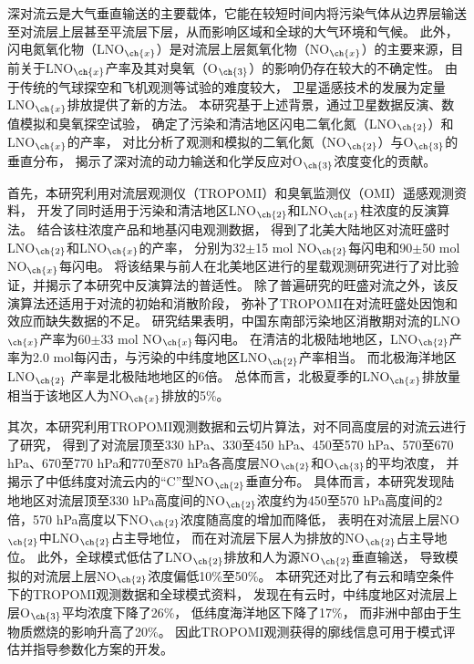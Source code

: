 
\abstract
{
深对流云是大气垂直输送的主要载体，它能在较短时间内将污染气体从边界层输送至对流层上层甚至平流层下层，从而影响区域和全球的大气环境和气候。
此外，闪电氮氧化物（LNO$_{\ch{x}}$）是对流层上层氮氧化物（NO$_{\ch{x}}$）的主要来源，目前关于LNO$_{\ch{x}}$产率及其对臭氧（O$_{\ch{3}}$）的影响仍存在较大的不确定性。
由于传统的气球探空和飞机观测等试验的难度较大，
卫星遥感技术的发展为定量LNO$_{\ch{x}}$排放提供了新的方法。
本研究基于上述背景，通过卫星数据反演、数值模拟和臭氧探空试验，
确定了污染和清洁地区闪电二氧化氮（LNO$_{\ch{2}}$）和LNO$_{\ch{x}}$的产率，
对比分析了观测和模拟的二氧化氮（NO$_{\ch{2}}$）与O$_{\ch{3}}$的垂直分布，
揭示了深对流的动力输送和化学反应对O$_{\ch{3}}$浓度变化的贡献。

首先，本研究利用对流层观测仪（TROPOMI）和臭氧监测仪（OMI）遥感观测资料，
开发了同时适用于污染和清洁地区LNO$_{\ch{2}}$和LNO$_{\ch{x}}$柱浓度的反演算法。
结合该柱浓度产品和地基闪电观测数据，
得到了北美大陆地区对流旺盛时LNO$_{\ch{2}}$和LNO$_{\ch{x}}$的产率，
分别为32$\pm$15 mol NO$_{\ch{2}}$每闪电和90$\pm$50 mol NO$_{\ch{x}}$每闪电。
将该结果与前人在北美地区进行的星载观测研究进行了对比验证，并揭示了本研究中反演算法的普适性。
除了普遍研究的旺盛对流之外，该反演算法还适用于对流的初始和消散阶段，
弥补了TROPOMI在对流旺盛处因饱和效应而缺失数据的不足。
研究结果表明，中国东南部污染地区消散期对流的LNO$_{\ch{x}}$产率为60$\pm$33 mol NO$_{\ch{x}}$每闪电。
在清洁的北极陆地地区，LNO$_{\ch{2}}$产率为2.0 mol每闪击，与污染的中纬度地区LNO$_{\ch{2}}$产率相当。
而北极海洋地区LNO$_{\ch{2}}$ 产率是北极陆地地区的6倍。
总体而言，北极夏季的LNO$_{\ch{x}}$排放量相当于该地区人为NO$_{\ch{x}}$排放的5\%。

其次，本研究利用TROPOMI观测数据和云切片算法，对不同高度层的对流云进行了研究，
得到了对流层顶至330 hPa、330至450 hPa、450至570 hPa、570至670 hPa、670至770 hPa和770至870 hPa各高度层NO$_{\ch{2}}$和O$_{\ch{3}}$的平均浓度，
并揭示了中低纬度对流云内的“C”型NO$_{\ch{2}}$垂直分布。
具体而言，本研究发现陆地地区对流层顶至330 hPa高度间的NO$_{\ch{2}}$浓度约为450至570 hPa高度间的2倍，570 hPa高度以下NO$_{\ch{2}}$浓度随高度的增加而降低，
表明在对流层上层NO$_{\ch{2}}$中LNO$_{\ch{2}}$占主导地位，
而在对流层下层人为排放的NO$_{\ch{2}}$占主导地位。
此外，全球模式低估了LNO$_{\ch{2}}$排放和人为源NO$_{\ch{2}}$垂直输送，
导致模拟的对流层上层NO$_{\ch{2}}$浓度偏低10\%至50\%。
本研究还对比了有云和晴空条件下的TROPOMI观测数据和全球模式资料，
发现在有云时，中纬度地区对流层上层O$_{\ch{3}}$平均浓度下降了26\%，
低纬度海洋地区下降了17\%，
而非洲中部由于生物质燃烧的影响升高了20\%。
因此TROPOMI观测获得的廓线信息可用于模式评估并指导参数化方案的开发。

}
